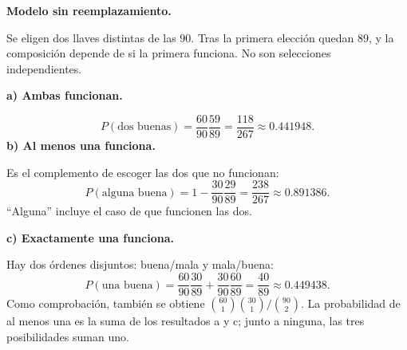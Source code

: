 \textbf{Modelo sin reemplazamiento.}\par\nopagebreak[4]
Se eligen dos llaves distintas de las $90$. Tras la primera elección quedan $89$, y la composición depende de si la primera funciona. No son selecciones independientes.

\textbf{a) Ambas funcionan.}\par\nopagebreak[4]
\[
\boxed{P(\text{dos buenas})=\frac{60}{90}\frac{59}{89}
=\frac{118}{267}\approx0.441948.}
\]
\textbf{b) Al menos una funciona.}\par\nopagebreak[4]
Es el complemento de escoger las dos que no funcionan:
\[
\boxed{P(\text{alguna buena})=1-\frac{30}{90}\frac{29}{89}
=\frac{238}{267}\approx0.891386.}
\]
``Alguna'' incluye el caso de que funcionen las dos.

\textbf{c) Exactamente una funciona.}\par\nopagebreak[4]
Hay dos órdenes disjuntos: buena/mala y mala/buena:
\[
\boxed{P(\text{una buena})=\frac{60}{90}\frac{30}{89}
+\frac{30}{90}\frac{60}{89}=\frac{40}{89}\approx0.449438.}
\]
Como comprobación, también se obtiene $\binom{60}{1}\binom{30}{1}/\binom{90}{2}$. La probabilidad de al menos una es la suma de los resultados a y c; junto a ninguna, las tres posibilidades suman uno.

